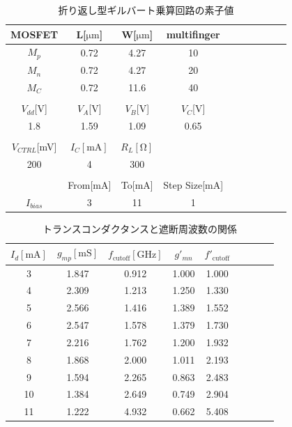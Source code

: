 \documentclass[twocolumn]{jsarticle}
\begin{document}
    \begin{table}[!h]
        \caption{折り返し型ギルバート乗算回路の素子値}
        \label{table:sim_s_g/d}
        \centering
        \begin{tabular}{cccccccccc}
            MOSFET & L[$\mathrm{\mu m}$] & W[$\mathrm{\mu m}$] & multifinger\\
            \hline \hline
            $M_{p}$ & 0.72 & 4.27 & 10 \\
            $M_{n}$ & 0.72 & 4.27 & 20 \\
            $M_{C}$ & 0.72 & 11.6 & 40 \\
            &&&\\
            $V_{dd}$[V] & $V_{A}$[V] & $V_{B}$[V] & $V_{C}$[V]\\
            \hline\hline
            1.8 & 1.59 & 1.09 & 0.65 \\
            &&&\\
             $V_{CTRL}$[mV] & $I_{C}\mathrm{[mA]}$ & $R_{L}[\mathrm{\Omega}]$ & \\
            \hline\hline
            200 & 4 & 300 &\\
            &&&\\
             & From[mA] & To[mA] & Step Size[mA]\\
            \hline\hline
            $I_{bias}$ & 3 & 11 & 1
        \end{tabular}
    \end{table}

    \begin{table}[!h]
        \caption{トランスコンダクタンスと遮断周波数の関係}
        \label{table:gm_cutoff}
        \centering
        \begin{tabular}{ccccccccc}
            $I_{d}[\mathrm{mA}]$ & $g_{mp}[\mathrm{mS}]$ & $f_{\mathrm{cutoff}}[\mathrm{GHz}]$ &$g\prime_{mn}$ & $f\prime_{\mathrm{cutoff}}$\\
            \hline\hline
            3 & 1.847 & 0.912 & 1.000 & 1.000\\
            4 & 2.309 & 1.213 & 1.250 & 1.330\\
            5 & 2.566 & 1.416 & 1.389 & 1.552\\
            6 & 2.547 & 1.578 & 1.379 & 1.730\\
            7 & 2.216 & 1.762 & 1.200 & 1.932\\
            8 & 1.868 & 2.000 & 1.011 & 2.193\\
            9 & 1.594 & 2.265 & 0.863 & 2.483\\
            10 & 1.384 & 2.649 & 0.749 & 2.904\\
            11 & 1.222 & 4.932 & 0.662 & 5.408
        \end{tabular}
    \end{table}
\end{document}
